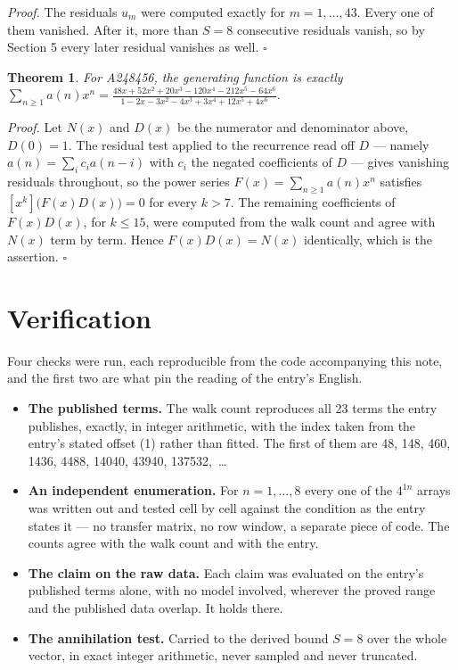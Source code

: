\documentclass[11pt]{article}
\newtheorem{theorem}{Theorem}
\theoremstyle{definition}
\begin{document}
{\itshape Proof.} The residuals $u_m$ were computed exactly for $m = 1,\dots,43$. Every one of them vanished. After it, more than $S = 8$ consecutive residuals vanish, so by Section 5 every later residual vanishes as well. $\square$

\begin{theorem} For A248456, the generating function is exactly $\sum_{n\ge 1} a(n)x^n = \frac{48x + 52x^{2} + 20x^{3} - 120x^{4} - 212x^{5} - 64x^{6}}{1 - 2x - 3x^{2} - 4x^{3} + 3x^{4} + 12x^{5} + 4x^{6}}$.\end{theorem}

{\itshape Proof.} Let $N(x)$ and $D(x)$ be the numerator and denominator above, $D(0)=1$. The residual test applied to the recurrence read off $D$ --- namely $a(n) = \sum_i c_i a(n-i)$ with $c_i$ the negated coefficients of $D$ --- gives vanishing residuals throughout, so the power series $F(x)=\sum_{n\ge 1}a(n)x^n$ satisfies $[x^k]\bigl(F(x)D(x)\bigr) = 0$ for every $k > 7$. The remaining coefficients of $F(x)D(x)$, for $k \le 15$, were computed from the walk count and agree with $N(x)$ term by term. Hence $F(x)D(x) = N(x)$ identically, which is the assertion. $\square$

\section{Verification}

Four checks were run, each reproducible from the code accompanying this note, and the first two are what pin the reading of the entry's English.

\begin{itemize}

\item {\bfseries The published terms.} The walk count reproduces all 23 terms the entry publishes, exactly, in integer arithmetic, with the index taken from the entry's stated offset (1) rather than fitted. The first of them are 48, 148, 460, 1436, 4488, 14040, 43940, 137532,~\dots

\item {\bfseries An independent enumeration.} For $n = 1,\dots,8$ every one of the $4^{1n}$ arrays was written out and tested cell by cell against the condition as the entry states it --- no transfer matrix, no row window, a separate piece of code. The counts agree with the walk count and with the entry.

\item {\bfseries The claim on the raw data.} Each claim was evaluated on the entry's published terms alone, with no model involved, wherever the proved range and the published data overlap. It holds there.

\item {\bfseries The annihilation test.} Carried to the derived bound $S = 8$ over the whole vector, in exact integer arithmetic, never sampled and never truncated.

\end{itemize}
\end{document}
